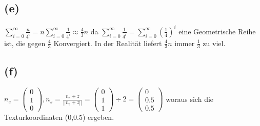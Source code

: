 \documentclass{article}
\begin{document}
\subsection*{(e)}

$\sum_{i=0}^{\infty}\frac{n}{4^i} = n\sum_{i=0}^{\infty}\frac{1}{4^i} \approx \frac{4}{3}n$ da $\sum_{i=0}^{\infty}\frac{1}{4^i} = \sum_{i=0}^{\infty}(\frac{1}{4})^i$ eine Geometrische Reihe ist, die gegen $\frac{4}{3}$ Konvergiert. In der Realität liefert $\frac{4}{3}n $ immer $\frac{1}{3}$ zu viel. %


\subsection*{(f)}
$n_e=\begin{pmatrix}
0\\1\\0
\end{pmatrix},
n_s = \frac{n_e + z}{||n_e + z||}=
\begin{pmatrix}
0\\1\\1
\end{pmatrix}\div 2 = 
\begin{pmatrix}
0\\0.5\\0.5
\end{pmatrix} $
woraus sich die Texturkoordinaten (0,0.5) ergeben.
\end{document}
